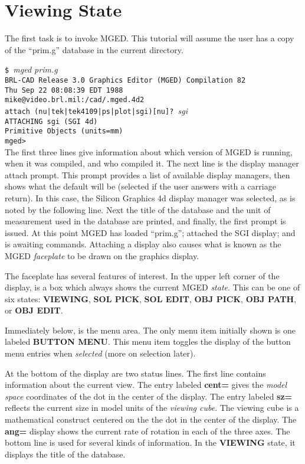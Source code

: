 \section{Viewing State}

The first task is to invoke MGED.  This tutorial will assume the user
has a copy of the ``prim.g'' database in the current directory.

\noindent
{\tt \$ }{\em mged prim.g}\\
{\tt BRL-CAD Release 3.0 Graphics Editor (MGED) Compilation 82}\\
{\tt Thu Sep 22 08:08:39 EDT 1988}\\
{\tt mike@video.brl.mil:/cad/.mged.4d2}\\

\noindent
{\tt attach (nu|tek|tek4109|ps|plot|sgi)[nu]? }{\em sgi}\\
{\tt ATTACHING sgi (SGI 4d)}\\
{\tt Primitive Objects (units=mm)}\\
{\tt mged> }\\

The first three lines give information about which version of MGED is running,
when it was compiled, and who compiled it.  The next line is the display
manager attach prompt.  This prompt provides a list of available display
managers, then shows what the default will be (selected if the user answers
with a carriage return).  In this case, the Silicon Graphics 4d display
manager was selected, as is noted by the following line.
Next the title of the database and
the unit of measurement used in the database are printed,
and finally, the first prompt is issued.
At this point MGED has loaded ``prim.g''; attached the SGI display;
and is awaiting commands.  Attaching a display also causes what
is known as the MGED {\sl faceplate} to be drawn on the graphics display.

The faceplate has several features of interest.  In the upper left corner
of the display, is a box which always shows the current MGED {\sl state}.
This can be one of six states:  {\bf VIEWING}, {\bf SOL PICK},
{\bf SOL EDIT}, {\bf OBJ PICK}, {\bf OBJ PATH}, or {\bf OBJ EDIT}.

Immediately below, is the menu area.  The only menu item initially shown is
one labeled {\bf BUTTON MENU}.  This menu item toggles the display of the
button menu entries when {\sl selected} (more on selection later).

At the bottom of the display are two status lines.  The first line
contains information about the current view.
The entry labeled {\bf cent=} gives the {\sl model space} coordinates
of the dot in the center of the display.
The entry labeled {\bf sz=} reflects the current size in model units of
the {\sl viewing cube}.  The viewing cube is a mathematical construct
centered on the the dot in the center of the display.  The {\bf ang=}
display shows the current rate of rotation in each of the three axes.
The bottom line is used for several kinds of information.
In the {\bf VIEWING} state, it displays the title of the database.

